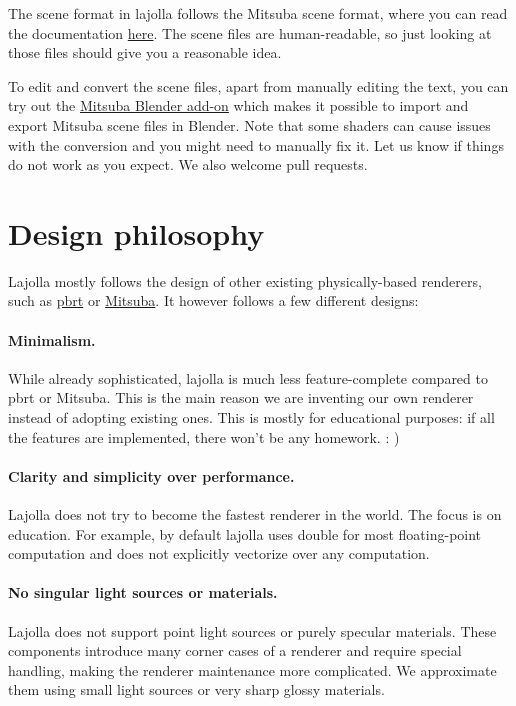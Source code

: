 The scene format in lajolla follows the Mitsuba scene format, where you can read the documentation \href{https://www.mitsuba-renderer.org/releases/current/documentation.pdf}{here}.
The scene files are human-readable, so just looking at those files should give you a reasonable idea.

To edit and convert the scene files, apart from manually editing the text, you can try out the \href{https://github.com/mitsuba-renderer/mitsuba-blender}{Mitsuba Blender add-on} which makes it possible to import and export Mitsuba scene files in Blender. Note that some shaders can cause issues with the conversion and you might need to manually fix it. Let us know if things do not work as you expect. We also welcome pull requests.

\section{Design philosophy}

Lajolla mostly follows the design of other existing physically-based renderers, such as \href{https://github.com/mmp/pbrt-v3/}{pbrt} or \href{http://www.mitsuba-renderer.org/}{Mitsuba}. It however follows a few different designs:

\paragraph{Minimalism.} While already sophisticated, lajolla is much less feature-complete compared to pbrt or Mitsuba. This is the main reason we are inventing our own renderer instead of adopting existing ones. This is mostly for educational purposes: if all the features are implemented, there won't be any homework. : )

\paragraph{Clarity and simplicity over performance.} Lajolla does not try to become the fastest renderer in the world. The focus is on education. For example, by default lajolla uses double for most floating-point computation and does not explicitly vectorize over any computation.

\paragraph{No singular light sources or materials.} Lajolla does not support point light sources or purely specular materials. These components introduce many corner cases of a renderer and require special handling, making the renderer maintenance more complicated. We approximate them using small light sources or very sharp glossy materials.

